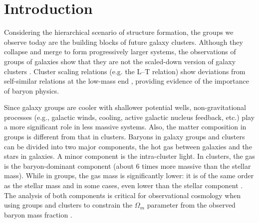\documentclass{aa}
\begin{document}

\maketitle

\section{Introduction}

Considering the hierarchical scenario of structure formation, the
groups we observe today are the building blocks of future galaxy
clusters. Although they collapse and merge to form progressively
larger systems, the observations of groups of galaxies show that they
are not the scaled-down version of galaxy clusters
\citep[e.g.,][]{mulchaey00,ponman03,voit05}. Cluster scaling relations
(e.g. the L--T relation) show deviations from self-similar relations
at the low-mass end \citep[e.g.,][ but see also \citet{eck11}]{voit05},
providing evidence of the importance of baryon physics.

Since galaxy groups are cooler with shallower potential wells,
non-gravitational processes (e.g., galactic winds, cooling, active
galactic nucleus feedback, etc.) play a more significant role in less
massive systems.  Also, the matter composition in groups is different
from that in clusters.  Baryons in galaxy groups and clusters can be
divided into two major components, the hot gas between galaxies
and the stars in galaxies. A minor component is the intra-cluster
light.  In clusters, the gas is the baryon-dominant component
(about 6 times more massive than the stellar mass). While in groups, the gas
mass is significantly lower: it is of
the same order as the stellar mass \citep[e.g.,][]{lagana11} and in
some cases, even lower than the stellar component
\citep[e.g.,][]{giodini09}.
The analysis of both components is critical for observational cosmology
when using groups and clusters to constrain the $\Omega_{m}$ parameter
from the observed baryon mass fraction \citep[e.g.,][]{allen02,V09}.
\end{document}

